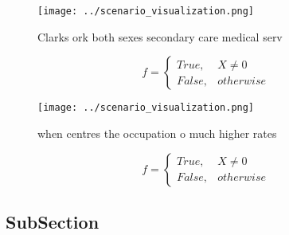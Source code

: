 \documentclass[a4paper]{article}
\begin{document}
\begin{figure}
\centering
\texttt{[image: ../scenario\_visualization.png]}
\caption{Clarks ork both sexes secondary care medical serv
}
\end{figure}
 
\begin{equation}   f =
\begin{cases} True, & X \neq 0\\
False, & otherwise
\end{cases}
\end{equation}

\begin{figure}
\centering
\texttt{[image: ../scenario\_visualization.png]}
\caption{ when centres the occupation o much higher rates 
}
\end{figure}
 
\begin{equation}   f =
\begin{cases} True, & X \neq 0\\
False, & otherwise
\end{cases}
\end{equation}

\subsection{SubSection}
\end{document}
